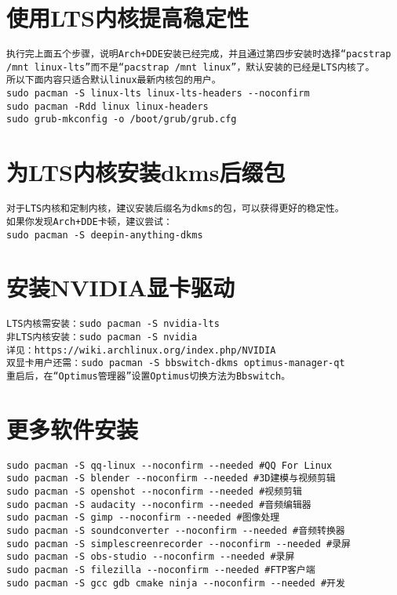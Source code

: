 \documentclass[a4paper,fontset=fandol,zihao=-4,linespread=1.2]{ctexbook}
\begin{document}
\section{使用LTS内核提高稳定性}
\begin{lstlisting}
执行完上面五个步骤，说明Arch+DDE安装已经完成，并且通过第四步安装时选择“pacstrap /mnt linux-lts”而不是“pacstrap /mnt linux”，默认安装的已经是LTS内核了。
所以下面内容只适合默认linux最新内核包的用户。
sudo pacman -S linux-lts linux-lts-headers --noconfirm
sudo pacman -Rdd linux linux-headers
sudo grub-mkconfig -o /boot/grub/grub.cfg
\end{lstlisting}

\section{为LTS内核安装dkms后缀包}
\begin{lstlisting}
对于LTS内核和定制内核，建议安装后缀名为dkms的包，可以获得更好的稳定性。
如果你发现Arch+DDE卡顿，建议尝试：
sudo pacman -S deepin-anything-dkms
\end{lstlisting}

\section{安装NVIDIA显卡驱动}
\begin{lstlisting}
LTS内核需安装：sudo pacman -S nvidia-lts
非LTS内核安装：sudo pacman -S nvidia
详见：https://wiki.archlinux.org/index.php/NVIDIA
双显卡用户还需：sudo pacman -S bbswitch-dkms optimus-manager-qt
重启后，在“Optimus管理器”设置Optimus切换方法为Bbswitch。
\end{lstlisting}

\section{更多软件安装}
\begin{lstlisting}
sudo pacman -S qq-linux --noconfirm --needed #QQ For Linux
sudo pacman -S blender --noconfirm --needed #3D建模与视频剪辑
sudo pacman -S openshot --noconfirm --needed #视频剪辑
sudo pacman -S audacity --noconfirm --needed #音频编辑器
sudo pacman -S gimp --noconfirm --needed #图像处理
sudo pacman -S soundconverter --noconfirm --needed #音频转换器
sudo pacman -S simplescreenrecorder --noconfirm --needed #录屏
sudo pacman -S obs-studio --noconfirm --needed #录屏
sudo pacman -S filezilla --noconfirm --needed #FTP客户端
sudo pacman -S gcc gdb cmake ninja --noconfirm --needed #开发
\end{lstlisting}
\end{document}
